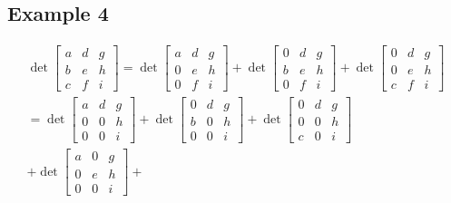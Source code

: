 \documentclass{article}
\theoremstyle{mytheoremstyle}
\theoremstyle{mytheoremstyle}
\theoremstyle{myproblemstyle}
\begin{document}
    \subsection*{Example 4}
    \begin{align*}
        \det \begin{bmatrix}
            a & d & g \\
            b & e & h \\
            c & f & i
        \end{bmatrix} = 
        \det \begin{bmatrix}
            a & d & g \\
            0 & e & h \\
            0 & f & i
        \end{bmatrix} + 
        \det \begin{bmatrix}
            0 & d & g \\
            b & e & h \\
            0 & f & i
        \end{bmatrix} +
        \det \begin{bmatrix}
            0 & d & g \\
            0 & e & h \\
            c & f & i
        \end{bmatrix} \\
        =\det \begin{bmatrix}
            a & d & g \\
            0 & 0 & h \\
            0 & 0 & i
        \end{bmatrix} + 
        \det \begin{bmatrix}
            0 & d & g \\
            b & 0 & h \\
            0 & 0 & i
        \end{bmatrix} +
        \det \begin{bmatrix}
            0 & d & g \\
            0 & 0 & h \\
            c & 0 & i
        \end{bmatrix} \\ +
        \det \begin{bmatrix}
            a & 0 & g \\
            0 & e & h \\
            0 & 0 & i
        \end{bmatrix} + 

\end{align*}
\end{document}
